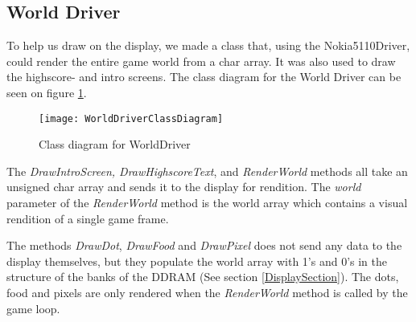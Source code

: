 \subsection{World Driver}
To help us draw on the display, we made a class that, using the Nokia5110Driver, could render the entire game world from a char array. It was also used to draw the highscore- and intro screens. The class diagram for the World Driver can be seen on figure \ref{WorldDriverClassDiagram}.

\begin{figure}[H]
	\texttt{[image: WorldDriverClassDiagram]}
	\centering
	\caption{Class diagram for WorldDriver}
	\label{WorldDriverClassDiagram}
\end{figure}

The \textit{DrawIntroScreen, DrawHighscoreText}, and \textit{RenderWorld} methods all take an unsigned char array and sends it to the display for rendition. The \textit{world} parameter of the \textit{RenderWorld} method is the world array which contains a visual rendition of a single game frame.

The methods \textit{DrawDot}, \textit{DrawFood} and \textit{DrawPixel} does not send any data to the display themselves, but they populate the world array with 1's and 0's in the structure of the banks of the DDRAM (See section \ref{DisplaySection}). The dots, food and pixels are only rendered when the \textit{RenderWorld} method is called by the game loop.